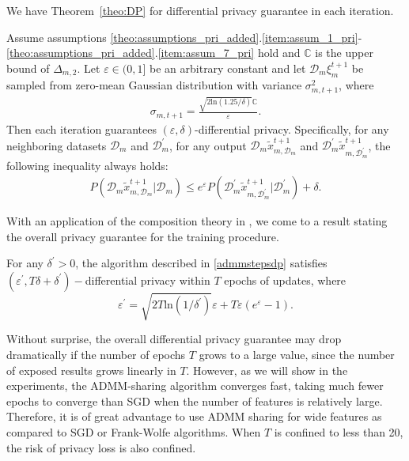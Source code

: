 We have Theorem~\ref{theo:DP} for differential privacy guarantee in each iteration.
\begin{theorem}\label{theo:DP}
  Assume assumptions \ref{theo:assumptions_pri_added}.\ref{item:assum_1_pri}-\ref{theo:assumptions_pri_added}.\ref{item:assum_7_pri} hold and $\mathbb{C}$ is the 
  upper bound of $\Delta_{m,2}$. Let $\varepsilon\in(0,1]$ be an arbitrary constant and let
  $\mathcal{D}_m\xi_m^{t+1}$ be sampled from zero-mean Gaussian distribution with variance $\sigma_{m,t+1}^2$,
  where
  \begin{eqnarray*}
    \sigma_{m,t+1}=\frac{\sqrt{2\text{ln}(1.25/\delta)}\mathbb{C}}{\varepsilon}.
  \end{eqnarray*}
  Then each iteration guarantees $(\varepsilon,\delta)$-differential privacy. Specifically,
  for any neighboring datasets $\mathcal{D}_m$ and $\mathcal{D}_m^{\prime}$, for any output
  $\mathcal{D}_m\tilde{x}_{m,\mathcal{D}_m}^{t+1}$ and $\mathcal{D}_m^{\prime}\tilde{x}_{m,\mathcal{D}_m^{\prime}}^{t+1}$, the following inequality always holds:
  \begin{eqnarray*}
    P(\mathcal{D}_m\tilde{x}_{m,\mathcal{D}_m}^{t+1}|\mathcal{D}_m)\leq e^{\varepsilon}
    P(\mathcal{D}_m^{\prime}\tilde{x}_{m,\mathcal{D}_m^{\prime}}^{t+1}|\mathcal{D}_m^{\prime})
    +\delta.
  \end{eqnarray*}
\end{theorem}

With an application of the composition theory in \cite{dwork2014algorithmic}, we come to a result stating the overall privacy guarantee for the training procedure.
\begin{coro}\label{theorem:overall_privacy}
  For any $\delta^{\prime}>0$, the algorithm described in \eqref{admmstepsdp} satisfies $(\varepsilon^{\prime}, T\delta+\delta^{\prime})-$differential privacy within $T$ epochs of updates, where
  \begin{equation}
    \varepsilon^{\prime}=\sqrt{2T\text{ln}(1/\delta^{\prime})}\varepsilon+T\varepsilon(e^\varepsilon - 1).
  \end{equation}
\end{coro}

Without surprise, the overall differential privacy guarantee may drop dramatically if the number of epochs $T$ grows to a large value, since the number of exposed results grows linearly in $T$. However, as we will show in the experiments, the ADMM-sharing algorithm converges fast, taking much fewer epochs to converge than SGD when the number of features is relatively large. Therefore, it is of great advantage to use ADMM sharing for wide features as compared to SGD or Frank-Wolfe algorithms. When $T$ is confined to less than 20, the risk of privacy loss is also confined.
